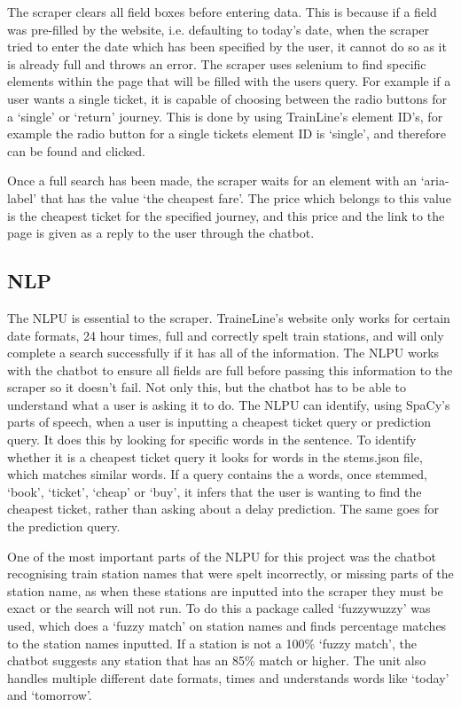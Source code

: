 \documentclass[11pt]{article}
\begin{document}
	The scraper clears all field boxes before entering data. This is because if a field was pre-filled by the website, i.e. defaulting to today's date, when the scraper tried to enter the date which has been specified by the user, it cannot do so as it is already full and throws an error. The scraper uses selenium to find specific elements within the page that will be filled with the users query. For example if a user wants a single ticket, it is capable of choosing between the radio buttons for a `single’ or `return’ journey. This is done by using TrainLine’s element ID’s, for example the radio button for a single tickets element ID is `single’, and therefore can be found and clicked. 
	
	Once a full search has been made, the scraper waits for an element with an `aria-label’ that has the value `the cheapest fare’. The price which belongs to this value is the cheapest ticket for the specified journey, and this price and the link to the page is given as a reply to the user through the chatbot.	
	
	\subsection{NLP}
	The NLPU is essential to the scraper. TraineLine’s website only works for certain date formats, 24 hour times, full and correctly spelt train stations, and will only complete a search successfully if it has all of the information. The NLPU works with the chatbot to ensure all fields are full before passing this information to the scraper so it doesn’t fail. Not only this, but the chatbot has to be able to understand what a user is asking it to do. The NLPU can identify, using SpaCy’s \citet{Spacydoc} parts of speech, when a user is inputting a cheapest ticket query or prediction query. It does this by looking for specific words in the sentence. To identify whether it is a cheapest ticket query it looks for words in the stems.json file, which matches similar words. If a query contains the a words, once stemmed,  `book’, `ticket’, `cheap’ or `buy’, it infers that the user is wanting to find the cheapest ticket, rather than asking about a delay prediction. The same goes for the prediction query.

	One of the most important parts of the NLPU for this project was the chatbot recognising train station names that were spelt incorrectly, or missing parts of the station name, as when these stations are inputted into the scraper they must be exact or the search will not run. To do this a package called ‘fuzzywuzzy’ was used, which does a ‘fuzzy match’ on station names and finds percentage matches to the station names inputted. If a station is not a 100\% `fuzzy match’, the chatbot suggests any station that has an 85\% match or higher. The unit also handles multiple different date formats, times and understands words like ‘today’ and ‘tomorrow’.
\end{document}
